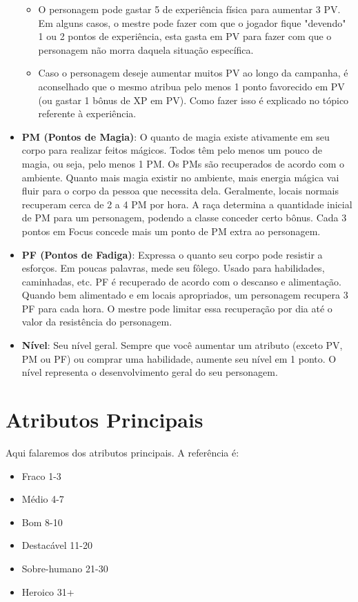 \begin{itemize}
\begin{itemize}
\item O personagem pode gastar 5 de experiência física para aumentar 3 PV. Em alguns casos, o mestre pode fazer com que o jogador fique "devendo" 1 ou 2 pontos de experiência, esta gasta em PV para fazer com que o personagem não morra daquela situação específica.
\item Caso o personagem deseje aumentar muitos PV ao longo da campanha, é aconselhado que o mesmo atribua pelo menos 1 ponto favorecido em PV (ou gastar 1 bônus de XP em PV). Como fazer isso é explicado no tópico referente à experiência.
\end{itemize}


\item \textbf{PM (Pontos de Magia)}: O quanto de magia existe ativamente em seu corpo para realizar feitos mágicos. Todos têm pelo menos um pouco de magia, ou seja, pelo menos 1 PM. Os PMs são recuperados de acordo com o ambiente. Quanto mais magia existir no ambiente, mais energia mágica vai fluir para o corpo da pessoa que necessita dela. Geralmente, locais normais recuperam cerca de 2 a 4 PM por hora. 
A raça determina a quantidade inicial de PM para um personagem, podendo a classe conceder certo bônus. Cada 3 pontos em Focus concede mais um ponto de PM extra ao personagem.

\item \textbf{PF (Pontos de Fadiga)}: Expressa o quanto seu corpo pode resistir a esforços. Em poucas palavras, mede seu fôlego. Usado para habilidades, caminhadas, etc. PF é recuperado de acordo com o descanso e alimentação. Quando bem alimentado e em locais apropriados, um personagem recupera 3 PF para cada hora. O mestre pode limitar essa recuperação por dia até o valor da resistência do personagem.

\item \textbf{Nível}: Seu nível geral. Sempre que você aumentar um atributo (exceto PV, PM ou PF) ou comprar uma habilidade, aumente seu nível em 1 ponto. O nível representa o desenvolvimento geral do seu personagem.

\end{itemize}

\section{Atributos Principais}

Aqui falaremos dos atributos principais. A referência é:

\begin{itemize}
	\item Fraco 1-3
	\item Médio 4-7
	\item Bom 8-10
	\item Destacável 11-20
	\item Sobre-humano 21-30
	\item Heroico 31+
\end{itemize}


